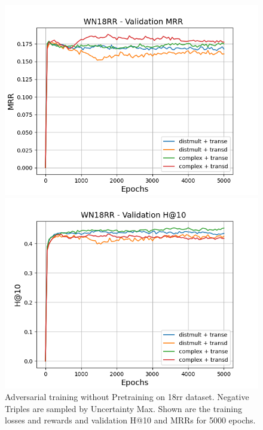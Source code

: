 \begin{figure}
\begin{minipage}{.5\textwidth}
    \end{minipage}
    \begin{minipage}{.5\textwidth}
      \centering
      \includegraphics[width=0.9\linewidth]{figures/results/gan_train/not_pretrained/uncertainty/max/entropy/wn18rr/gan_train_uncertainty_wn18rr_mrrs.png}
    \end{minipage}%
    \begin{minipage}{.5\textwidth}
      \centering
      \includegraphics[width=0.9\linewidth]{figures/results/gan_train/not_pretrained/uncertainty/max/entropy/wn18rr/gan_train_uncertainty_wn18rr_hit10s.png}
    \end{minipage}%
    \caption{Adversarial training without Pretraining on \wn18rr dataset. 
    Negative Triples are sampled by Uncertainty Max.
    Shown are the training losses and rewards and validation H@10 and MRRs for 5000 epochs.}
    \label{fig:advtrain_wn18rr_not_pretrained_uncertainty_max}
\end{figure}

